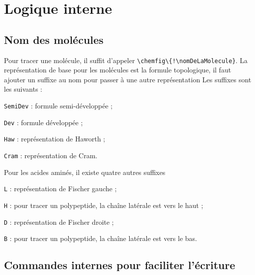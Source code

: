 \documentclass[12pt]{extarticle}
\begin{document}
  \tableofcontents
  
  \section{Logique interne}
  
  \subsection{Nom des molécules}
  
  Pour tracer une molécule, il suffit d'appeler \lstinline|\chemfig\{!\nomDeLaMolecule}|.
  La représentation de base pour les molécules est la formule topologique, il faut ajouter un suffixe au nom pour passer à une autre représentation  Les suffixes sont les suivants :
  \begin{listePoints}[2]
    \item \lstinline{SemiDev} : formule semi-développée ;
    \item \lstinline{Dev} : formule développée ;
    \item \lstinline{Haw} : représentation de Haworth ;
    \item \lstinline{Cram} : représentation de Cram.
  \end{listePoints}
  Pour les acides aminés, il existe quatre autres suffixes
  \begin{listePoints}[2]
    \item \lstinline{L} : représentation de Fischer gauche ;
    \item \lstinline{H} : pour tracer un polypeptide, la chaîne latérale est vers le haut ;
    \item \lstinline{D} : représentation de Fischer droite ;
    \item \lstinline{B} : pour tracer un polypeptide, la chaîne latérale est vers le bas.
  \end{listePoints}
  
  \subsection{Commandes internes pour faciliter l'écriture}
  
\end{document}
